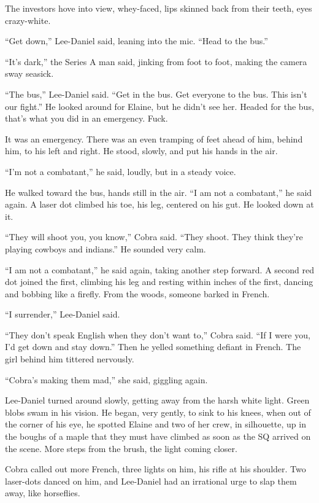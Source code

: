 The investors hove into view, whey-faced, lips skinned back from their 
teeth, eyes crazy-white.

“Get down,” Lee-Daniel said, leaning into the mic. “Head to the 
bus.”

“It's dark,” the Series A man said, jinking from foot to foot, 
making the camera sway seasick.

“The bus,” Lee-Daniel said. “Get in the bus. Get everyone to the 
bus. This isn't our fight.” He looked around for Elaine, but he 
didn't see her. Headed for the bus, that's what you did in an 
emergency. Fuck.

It was an emergency. There was an even tramping of feet ahead of him, 
behind him, to his left and right. He stood, slowly, and put his hands 
in the air.

“I'm not a combatant,” he said, loudly, but in a steady voice.

He walked toward the bus, hands still in the air. “I am not a 
combatant,” he said again. A laser dot climbed his toe, his leg, 
centered on his gut. He looked down at it.

“They will shoot you, you know,” Cobra said. “They shoot. They 
think they're playing cowboys and indians.” He sounded very calm.

“I am not a combatant,” he said again, taking another step forward. 
A second red dot joined the first, climbing his leg and resting within 
inches of the first, dancing and bobbing like a firefly. From the 
woods, someone barked in French.

“I surrender,” Lee-Daniel said.

“They don't speak English when they don't want to,” Cobra said. 
“If I were you, I'd get down and stay down.” Then he yelled 
something defiant in French. The girl behind him tittered nervously.

“Cobra's making them mad,” she said, giggling again.

Lee-Daniel turned around slowly, getting away from the harsh white 
light. Green blobs swam in his vision. He began, very gently, to sink 
to his knees, when out of the corner of his eye, he spotted Elaine and 
two of her crew, in silhouette, up in the boughs of a maple that they 
must have climbed as soon as the SQ arrived on the scene. More steps 
from the brush, the light coming closer.

Cobra called out more French, three lights on him, his rifle at his 
shoulder. Two laser-dots danced on him, and Lee-Daniel had an 
irrational urge to slap them away, like horseflies.

